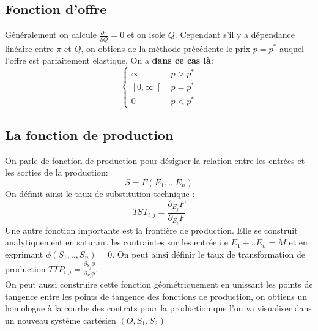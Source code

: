 \subsection{Fonction d'offre}

Généralement on calcule $ \frac{\partial \pi}{\partial Q}=0$ et on isole $Q$. Cependant s'il y a dépendance linéaire entre $\pi$ et $Q$, on obtiens de la méthode précédente le prix $p=p^*$ auquel l'offre est parfaitement élastique. On a \textbf{dans ce cas là}:
$$
\left\{
\begin{array}{cc}
\infty & p>p^* \\
\left[0,\infty\right[ & p=p^* \\
0 & p<p^*
\end{array} 
\right.
$$

\subsection{La fonction de production}

On parle de fonction de production pour désigner la relation entre les entrées et les sorties de la production:
$$
S=F(E_1,...E_n)
$$
On définit ainsi le taux de substitution technique :
$$
TST_{i,j}=\frac{\partial_{E_j} F}{\partial_{E_i} F}
$$
Une autre fonction importante est la frontière de production. Elle se construit analytiquement en saturant les contraintes sur les entrée i.e $E_1+..E_n=M$ et en exprimant $\phi (S_1,..,S_n)=0$. On peut ainsi définir le taux de transformation de production $TTP_{i,j}=\frac{\partial_{S_j} \phi}{\partial_{S_i} \phi}$.\\
On peut aussi construire cette fonction géométriquement en unissant les points de tangence entre les points de tangence des fonctions de production, on obtiens un homologue à la courbe des contrats pour la production que l'on va visualiser dans un nouveau système cartésien $(O,S_1,S_2)$


